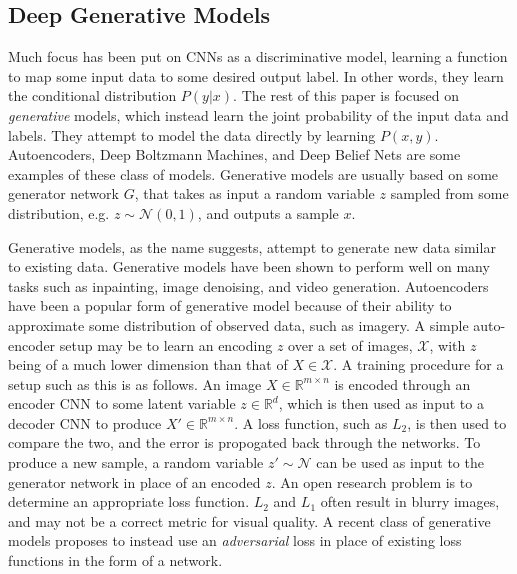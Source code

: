 \documentclass[9pt]{article}
\begin{document}
\subsection{Deep Generative Models}
\noindent Much focus has been put on CNNs as a discriminative model, learning a function to map some input data to some desired output label. In other words,
they learn the conditional distribution $P(y|x)$. The rest of this paper is focused on \textit{generative} models, which instead learn the joint
probability of the input data and labels. They attempt to model the data directly by learning $P(x,y)$. Autoencoders, Deep Boltzmann Machines, and
Deep Belief Nets are some examples of these class of models. Generative models are usually based on some generator network $G$, that takes as input
a random variable $z$ sampled from some distribution, e.g. $z \sim \mathcal{N}(0,1)$, and outputs a sample $x$. \newline

\noindent Generative models, as the name suggests, attempt to generate new data similar to existing data. Generative models have been shown to perform
well on many tasks such as inpainting, image denoising, and video generation. Autoencoders have been a popular form of generative model because of their
ability to approximate some distribution of observed data, such as imagery. A simple auto-encoder setup may be to learn an encoding $z$ over a set of images,
$\mathcal{X}$, with $z$ being of a much lower dimension than that of $X \in{\mathcal{X}}$. A training procedure for a setup such as this is as follows.
An image $X \in{\mathbb{R}^{m\times n}}$ is encoded through an encoder CNN to some latent variable $z \in{\mathbb{R}^{d}}$, which is then used as input to a
decoder CNN to produce $X' \in{\mathbb{R}^{m\times n}}$. A loss function, such as $L_2$, is then used to compare the two, and the error is propogated back through
the networks. To produce a new sample, a random variable $z' \sim \mathcal{N}$ can be used as input to the generator network in place of an encoded $z$. 
An open research problem is to determine an appropriate loss function. $L_2$ and $L_1$ often result in blurry images, and may not be a correct metric for
visual quality. A recent class of generative models proposes to instead use an \textit{adversarial} loss in place of existing loss functions in the form of
a network.

\end{document}
